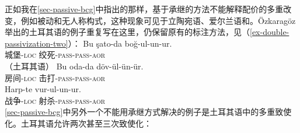 \begin{exe}
\begin{xlist}[iv.]
\begin{exe}
\begin{xlist}[iv.]
正如我在\ref{sec-passive-bcg}中指出的那样，基于承继的方法不能解释配价的多重改变，例如被动和无人称构式，这种现象可见于立陶宛语\citep[\S~5]{Timberlake82a}、爱尔兰语\citep{Noonan94a}和\citep{Ozkaragoez86a}。Özkaragöz举出的土耳其语的例子重复写在这里，仍保留原有的标注方法，见（\ref{ex-double-passivization-two}）：
\eal\label{ex-double-passivization-two}
\ex\label{ex-double-passivization-strangle-two}
\gll Bu şato-da boğ-ul-un-ur.\\
      城堡-\textsc{loc} 绞死-\textsc{pass}-\textsc{pass}-\textsc{aor}\\\hfill（土耳其语）
\ex\label{ex-double-passivization-hit-two}
\gll Bu oda-da döv-ül-ün-ür.\\
      房间-\textsc{loc} 击打-\textsc{pass}-\textsc{pass}-\textsc{aor}\\
\ex
\gll Harp-te vur-ul-un-ur.\\
     战争-\textsc{loc} 射杀-\textsc{pass}-\textsc{pass}-\textsc{aor}\\
\zl
\ref{sec-passive-bcg}中另外一个不能用承继方式解决的例子是土耳其语中的多重致使化。土耳其语允许两次甚至三次致使化\citep[]{Lewis67a-u}：

\end{xlist}
\end{exe}
\end{xlist}
\end{exe}
